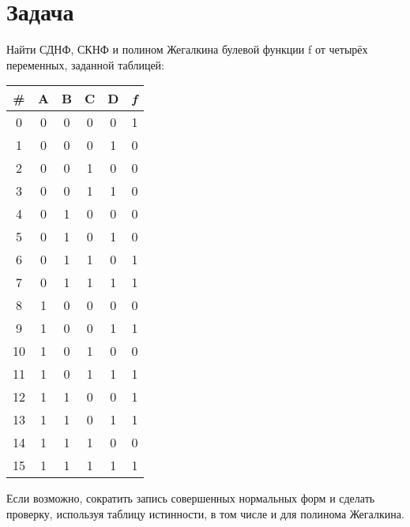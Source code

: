 \documentclass[a4paper, 14pt]{extarticle}
\begin{document}
\section{Задача }

Найти СДНФ, СКНФ и полином Жегалкина булевой функции f от четырёх переменных,
заданной таблицей:

\begin{table}[h!]
  \centering
  \setlength{\arrayrulewidth}{0.5mm}
  \setlength{\tabcolsep}{38pt}
  \renewcommand{\arraystretch}{1.5}
  \begin{adjustbox}{max width=1\textwidth}
    \begin{tabular}{|c|c|c|c|c|c|}
    \hline
    \rowcolor{gray!50}
    \# & \bfseries A & \bfseries B & \bfseries C & \bfseries D & \bfseries \itshape f \\
    \hline
    0 & 0 & 0 & 0 & 0 & 1 \\
    \hline
    1 & 0 & 0 & 0 & 1 & 0 \\
    \hline
    2 & 0 & 0 & 1 & 0 & 0 \\
    \hline
    3 & 0 & 0 & 1 & 1 & 0 \\
    \hline
    4 & 0 & 1 & 0 & 0 & 0 \\
    \hline
    5 & 0 & 1 & 0 & 1 & 0 \\
    \hline
    6 & 0 & 1 & 1 & 0 & 1 \\
    \hline
    7 & 0 & 1 & 1 & 1 & 1 \\
    \hline
    8 & 1 & 0 & 0 & 0 & 0 \\
    \hline
    9 & 1 & 0 & 0 & 1 & 1 \\
    \hline
    10 & 1 & 0 & 1 & 0 & 0 \\
    \hline
    11 & 1 & 0 & 1 & 1 & 1 \\
    \hline
    12 & 1 & 1 & 0 & 0 & 1 \\
    \hline
    13 & 1 & 1 & 0 & 1 & 1 \\
    \hline
    14 & 1 & 1 & 1 & 0 & 0 \\
    \hline
    15 & 1 & 1 & 1 & 1 & 1 \\
    \hline
    \end{tabular}
  \end{adjustbox}
\end{table}

Если возможно, сократить запись совершенных нормальных
форм и сделать проверку, используя таблицу истинности, в том числе и для полинома
Жегалкина.

\newpage
\end{document}
